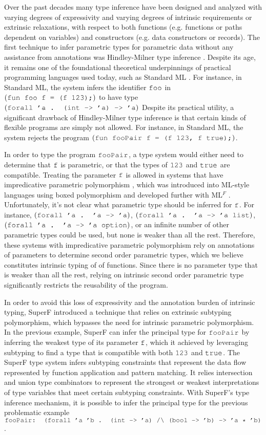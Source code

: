 \documentclass[acmsmall]{acmart}
\theoremstyle{definition}
\begin{document}
Over the past decades many type inference have been designed and analyzed 
with varying degrees of expressivity and varying degrees of intrinsic requirements
or extrinsic relaxations, with respect to both functions (e.g. functions or paths dependent on variables)
and constructors (e.g. data constructors or records).  
The first technique to infer parametric types for parametric
data without any assistance from annotations was Hindley-Milner type inference \cite{}. Despite its age, 
it remains one of the foundational 
theoretical underpinnings of practical programming languages used today, such as Standard ML \cite{}. 
For instance, in Standard ML, the system infers the identifier $\J{foo}$ in $(\J{fun foo f = (f 123);})$
to have type $(\J{forall 'a . (int -> 'a) -> 'a})$ 
Despite its practical utility, a significant drawback of Hindley-Milner type inference is that
certain kinds of flexible programs are simply not allowed.
For instance, in Standard ML, the system rejects the program $(\J{fun fooPair f = (f 123, f true);})$.

In order to type the program $\J{fooPair}$, a type system would either need to determine that
$\J{f}$ is parametric, or that the types of $\J{123}$ and $\J{true}$ are compatible.
Treating the parameter $\J{f}$ is allowed in systems that have impredicative parametric polymorphism \cite{}, which
was introduced into ML-style languages using boxed polymorphism \cite{} and developed further with ML$^F$ \cite{}. 
Unfortunately, it's not clear what parametric type should be inferred for $\J{f}$.
For instance, $(\J{forall 'a . 'a -> 'a})$, $(\J{forall 'a . 'a -> 'a list})$, $(\J{forall 'a . 'a -> 'a option})$, 
or an infinite number of
other parametric types could be used, but none is weaker than all the rest.
Therefore, these systems with impredicative parametric polymorphism rely on annotations of parameters to
determine second order parametric types, which we believe constitutes intrinsic typing of
of functions. Since there is no parameter type that is weaker than all the rest,
relying on intrinsic second order parametric type significantly restricts the reusability
of the program.

In order to avoid this loss of expressivity and the annotation burden of intrinsic typing, 
SuperF \cite{} introduced 
a technique that relies on extrinsic subtyping polymorphism, 
which bypasses the need for intrinsic parametric polymorphism.
In the previous example, SuperF can infer the principal type for $\J{fooPair}$ by inferring the 
weakest type of its parameter $\J{f}$, which it achieved by leveraging subtyping to find 
a type that is compatible with both $\J{123}$ and $\J{true}$.
The SuperF type system infers subtyping constraints that represent the data flow represented by
function application and pattern matching. It relies 
intersection and union type combinators to represent the strongest or weakest interpretations
of type variables that meet certain subtyping constraints.   
With SuperF's type inference mechanism, it is possible to infer the principal type for the 
previous problematic example $\J{fooPair: (forall 'a 'b . (int -> 'a) /\textbackslash\ (bool -> 'b) -> 'a * 'b)}$.
\end{document}
